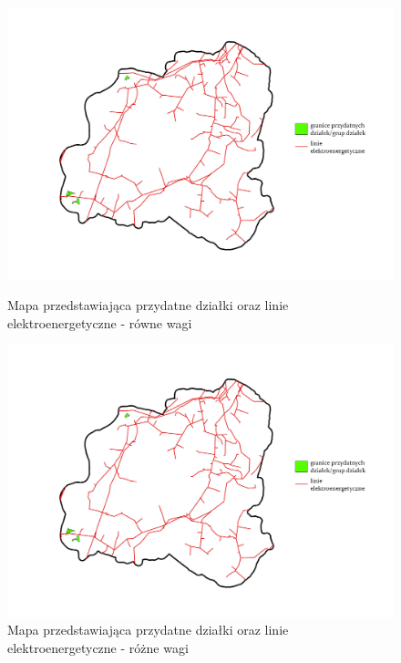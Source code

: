 \documentclass{article}
\begin{document}
\begin{figure}[H]
    \begin{minipage}[t]{0.48\textwidth}
        \centering
        \includegraphics[width=\linewidth]{img/plesna-dzialki-linie.jpg}
        \caption{Mapa przedstawiająca przydatne działki oraz linie elektroenergetyczne - równe wagi}
        \label{fig:dzialki-linie-rowne}
    \end{minipage}
    \hfill
    \begin{minipage}[t]{0.48\textwidth}
        \centering
        \includegraphics[width=\linewidth]{img/plesna-dzialki-linie.jpg}
        \caption{Mapa przedstawiająca przydatne działki oraz linie elektroenergetyczne - różne wagi}
        \label{fig:dzialki-linie-rozne}
    \end{minipage}
\end{figure}
\end{document}
